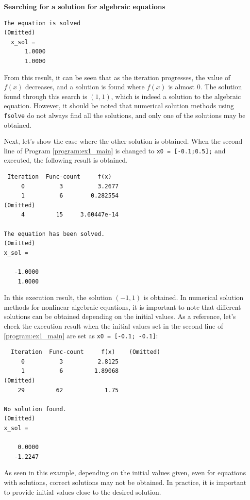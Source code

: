 \documentclass[graybox, envcountchap]{svmult}
\begin{document}
\begin{example}{\textbf{Searching for a solution for algebraic
equations}}
\begin{execution}
\begin{verbatim}
The equation is solved
(Omitted)
  x_sol =
      1.0000
      1.0000
\end{verbatim}
\end{execution}

From this result, it can be seen that as the iteration progresses, the value of
$f(x)$ decreases, and a solution is found where $f(x)$ is almost 0. The solution
found through this search is $(1, 1)$, which is indeed a solution to the
algebraic equation. However, it should be noted that numerical solution methods
using \verb|fsolve| do not always find all the solutions, and only one of the
solutions may be obtained.

Next, let's show the case where the other solution is obtained. When the second
line of Program \nobreak\ref{program:ex1_main} is changed to \verb|x0 = [-0.1;0.5];|
and executed, the following result is obtained.

\smallskip
\begin{execution}
\begin{verbatim}
 Iteration  Func-count     f(x)   
     0          3          3.2677
     1          6        0.282554
(Omitted)
     4         15     3.60447e-14

The equation has been solved.
(Omitted)
x_sol =

   -1.0000
    1.0000
\end{verbatim}
\end{execution}

In this execution result, the solution $(-1, 1)$ is obtained. In numerical
solution methods for nonlinear algebraic equations, it is important to note that
different solutions can be obtained depending on the initial values. As a
reference, let's check the execution result when the initial values set in the
second line of \nobreak\ref{program:ex1_main} are set as \verb|x0 = [-0.1; -0.1]|:

\smallskip
\begin{execution}
    \begin{verbatim}
  Iteration  Func-count     f(x)    (Omitted) 
     0          3          2.8125
     1          6         1.89068
(Omitted)
    29         62            1.75

No solution found.
(Omitted)
x_sol =

    0.0000
   -1.2247
\end{verbatim}
\end{execution}

As seen in this example, depending on the initial values given, even for
equations with solutions, correct solutions may not be obtained. In practice, it
is important to provide initial values close to the desired solution.
\end{example}
\end{document}
